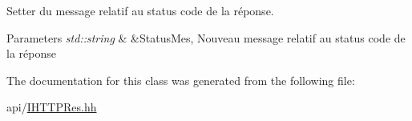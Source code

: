 Setter du message relatif au status code de la réponse. 


\begin{DoxyParams}{Parameters}
{\em std\+::string} & \&Status\+Mes, Nouveau message relatif au status code de la réponse \\
\hline
\end{DoxyParams}


The documentation for this class was generated from the following file\+:\begin{DoxyCompactItemize}
\item 
api/\hyperlink{_i_h_t_t_p_res_8hh}{I\+H\+T\+T\+P\+Res.\+hh}\end{DoxyCompactItemize}
